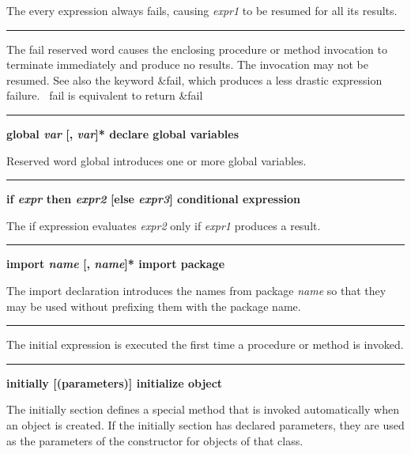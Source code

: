 \noindent
{}The \textsf{every} expression always fails, causing
\textit{expr1} to be resumed for all its results.

\bigskip\hrule\vspace{0.1cm}

\noindent
{}The \textsf{fail} reserved word causes the enclosing
procedure or method invocation to terminate immediately and produce no
results. The invocation may not be resumed. See also the keyword
\textsf{\&fail}, which produces a less drastic expression failure.
\ \textsf{fail} is equivalent to \textsf{return \&fail}

\bigskip\hrule\vspace{0.1cm}
{\bf \textbf{global} \textit{var} [,
\textit{var}]* \hfill declare global variables}

\noindent
{}Reserved word \textsf{global} introduces one or more
global variables.

\bigskip\hrule\vspace{0.1cm}
{\bf \textbf{if} \textit{expr} then
\textit{expr2} [else \textit{expr3}] \hfill conditional expression}

\noindent
{}The \textsf{if} expression evaluates \textit{expr2} only if
\textit{expr1} produces a result.

\bigskip\hrule\vspace{0.1cm}
{\bf \textbf{import} \textit{name} [,
\textit{name}]* \hfill import package}

\noindent
{}The \textsf{import} declaration introduces the names from
package \textit{name} so that they may be used without prefixing them
with the package name.

\bigskip\hrule\vspace{0.1cm}

\noindent
{}The \textsf{initial} expression is executed the first
time a procedure or method is invoked.

\bigskip\hrule\vspace{0.1cm}
{\bf \textbf{initially} [(parameters)] \hfill initialize object}

\noindent
{}The \textsf{initially} section defines a special method
that is invoked automatically when an object is created. If the
\textsf{initially} section has declared parameters, they are used as
the parameters of the constructor for objects
of that class.

